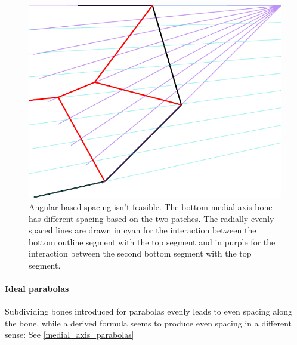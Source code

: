 \begin{figure}[H]
\centering
\includegraphics[width=.5\columnwidth]{sources/method/angular_based_spacing.pdf}
\caption{Angular based spacing isn't feasible. The bottom medial axis bone has different spacing based on the two patches. The radially evenly spaced lines are drawn in cyan for the interaction between the bottom outline segment with the top segment and in purple for the interaction between the second bottom segment with  the top segment.}
\label{angular_based_spacing}
\end{figure}


\paragraph{Ideal parabolas}
Subdividing bones introduced for parabolas evenly leads to even spacing along the bone,
while a derived formula seems to produce even spacing in a different sense:
See \cref{medial_axis_parabolas}

